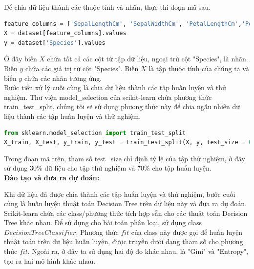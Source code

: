 Để chia dữ liệu thành các thuộc tính và nhãn, thực thi đoạn mã sau.

\begin{center}
\begin{lstlisting}[language=Python,breaklines=true]
feature_columns = ['SepalLengthCm', 'SepalWidthCm', 'PetalLengthCm','PetalWidthCm']
X = dataset[feature_columns].values
y = dataset['Species'].values
\end{lstlisting}
\end{center}

Ở đây biến $X$ chứa tất cả các cột từ tập dữ liệu, ngoại trừ cột "Species", là nhãn. Biến $y$ chứa các giá trị từ cột "Species". Biến $X$ là tập thuộc tính của chúng ta và biến $y$ chứa các nhãn tương ứng.\\

Bước tiền xử lý cuối cùng là chia dữ liệu thành các tập huấn luyện và thử nghiệm. Thư viện model\_selection của scikit-learn chứa phương thức train\_test\_split, chúng tôi sẽ sử dụng phương thức này để chia ngẫu nhiên dữ liệu thành các tập huấn luyện và thử nghiệm.

\begin{center}
\begin{lstlisting}[language=Python,breaklines=true]
from sklearn.model_selection import train_test_split
X_train, X_test, y_train, y_test = train_test_split(X, y, test_size = 0.3, random_state = 0)
\end{lstlisting}
\end{center}

Trong đoạn mã trên, tham số test\_size chỉ định tỷ lệ của tập thử nghiệm, ở đây sử dụng 30\% dữ liệu cho tập thử nghiệm và 70\% cho tập huấn luyện.\\

\textbf{Đào tạo và đưa ra dự đoán:}

Khi dữ liệu đã được chia thành các tập huấn luyện và thử nghiệm, bước cuối cùng là huấn luyện thuật toán Decision Tree trên dữ liệu này và đưa ra dự đoán. Scikit-learn chứa các class/phương thức tích hợp sẵn cho các thuật toán Decision Tree khác nhau. Để sử dụng cho bài toán phân loại, sử dụng class $DecisionTreeClassifier$. Phương thức $fit$ của class này được gọi để huấn luyện thuật toán trên dữ liệu huấn luyện, được truyền dưới dạng tham số cho phương thức $fit$. Ngoài ra, ở đây ta sử dụng hai độ đo khác nhau, là "Gini" và "Entropy", tạo ra hai mô hình khác nhau.

